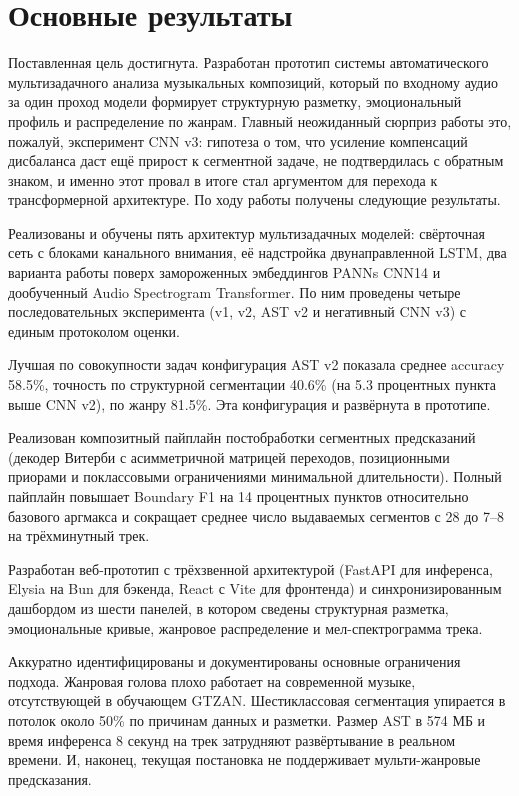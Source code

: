 \conclusion

\section*{Основные результаты}

Поставленная цель достигнута. Разработан прототип системы автоматического мультизадачного анализа музыкальных композиций, который по входному аудио за один проход модели формирует структурную разметку, эмоциональный профиль и распределение по жанрам. Главный неожиданный сюрприз работы это, пожалуй, эксперимент CNN v3: гипотеза о том, что усиление компенсаций дисбаланса даст ещё прирост к сегментной задаче, не подтвердилась с обратным знаком, и именно этот провал в итоге стал аргументом для перехода к трансформерной архитектуре. По ходу работы получены следующие результаты.

Реализованы и обучены пять архитектур мультизадачных моделей: свёрточная сеть с блоками канального внимания, её надстройка двунаправленной LSTM, два варианта работы поверх замороженных эмбеддингов PANNs CNN14 и дообученный Audio Spectrogram Transformer. По ним проведены четыре последовательных эксперимента (v1, v2, AST v2 и негативный CNN v3) с единым протоколом оценки.

Лучшая по совокупности задач конфигурация AST v2 показала среднее accuracy 58.5\%, точность по структурной сегментации 40.6\% (на 5.3 процентных пункта выше CNN v2), по жанру 81.5\%. Эта конфигурация и развёрнута в прототипе.

Реализован композитный пайплайн постобработки сегментных предсказаний (декодер Витерби с асимметричной матрицей переходов, позиционными приорами и поклассовыми ограничениями минимальной длительности). Полный пайплайн повышает Boundary F1 на 14 процентных пунктов относительно базового аргмакса и сокращает среднее число выдаваемых сегментов с 28 до 7--8 на трёхминутный трек.

Разработан веб-прототип с трёхзвенной архитектурой (FastAPI для инференса, Elysia на Bun для бэкенда, React с Vite для фронтенда) и синхронизированным дашбордом из шести панелей, в котором сведены структурная разметка, эмоциональные кривые, жанровое распределение и мел-спектрограмма трека.

Аккуратно идентифицированы и документированы основные ограничения подхода. Жанровая голова плохо работает на современной музыке, отсутствующей в обучающем GTZAN. Шестиклассовая сегментация упирается в потолок около 50\% по причинам данных и разметки. Размер AST в 574 МБ и время инференса 8 секунд на трек затрудняют развёртывание в реальном времени. И, наконец, текущая постановка не поддерживает мульти-жанровые предсказания.

